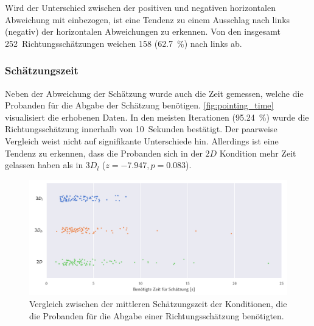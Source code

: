 Wird der Unterschied zwischen der positiven und negativen horizontalen Abweichung mit einbezogen, ist eine Tendenz zu einem Ausschlag nach links (negativ) der horizontalen Abweichungen zu erkennen.
Von den insgesamt 252~Richtungsschätzungen weichen 158 (\SI{62,7}{\percent}) nach links ab.

\subsubsection*{Schätzungszeit}
Neben der Abweichung der Schätzung wurde auch die Zeit gemessen, welche die Probanden für die Abgabe der Schätzung benötigen.
\autoref{fig:pointing_time} visualisiert die erhobenen Daten.
In den meisten Iterationen (\SI{95,24}{\percent}) wurde die Richtungsschätzung innerhalb von 10~Sekunden bestätigt.
Der paarweise Vergleich weist nicht auf signifikante Unterschiede hin.
Allerdings ist eine Tendenz zu erkennen, dass die Probanden sich in der $2D$ Kondition mehr Zeit gelassen haben als in $3D_l$ ($z = -7.947,	p = 0.083$).
\begin{figure}[h]
    \centering
    \includegraphics[width=\linewidth]{figures/analysis/pointing_time}
    \caption{Vergleich zwischen der mittleren Schätzungszeit der Konditionen, die die Probanden für die Abgabe einer Richtungsschätzung benötigten.}
    \label{fig:pointing_time}
\end{figure}

